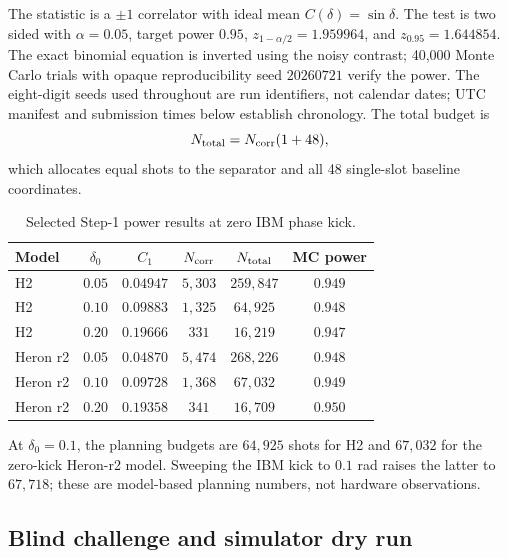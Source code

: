 \documentclass[aps,prl,onecolumn,superscriptaddress,nofootinbib]{revtex4-2}
\begin{document}
The statistic is a $\pm1$ correlator with ideal mean $C(\delta)=\sin\delta$.  The test is two sided with $\alpha=0.05$, target power $0.95$, $z_{1-\alpha/2}=1.959964$, and $z_{0.95}=1.644854$.  The exact binomial equation is inverted using the noisy contrast; 40,000 Monte Carlo trials with opaque reproducibility seed $20260721$ verify the power.  The eight-digit seeds used throughout are run identifiers, not calendar dates; UTC manifest and submission times below establish chronology.  The total budget is
\begin{equation}
 N_{\rm total}=N_{\rm corr}(1+48),
 \label{eq:power-total}
\end{equation}
which allocates equal shots to the separator and all 48 single-slot baseline coordinates.

\begin{table}[t]
\caption{Selected Step-1 power results at zero IBM phase kick.}
\label{tab:step1-power}
\begin{ruledtabular}
\begin{tabular}{lccccc}
Model & $\delta_0$ & $C_1$ & $N_{\rm corr}$ & $N_{\rm total}$ & MC power\\
\hline
H2 & $0.05$ & $0.04947$ & $5{,}303$ & $259{,}847$ & $0.949$\\
H2 & $0.10$ & $0.09883$ & $1{,}325$ & $64{,}925$ & $0.948$\\
H2 & $0.20$ & $0.19666$ & $331$ & $16{,}219$ & $0.947$\\
Heron r2 & $0.05$ & $0.04870$ & $5{,}474$ & $268{,}226$ & $0.948$\\
Heron r2 & $0.10$ & $0.09728$ & $1{,}368$ & $67{,}032$ & $0.949$\\
Heron r2 & $0.20$ & $0.19358$ & $341$ & $16{,}709$ & $0.950$\\
\end{tabular}
\end{ruledtabular}
\end{table}

At $\delta_0=0.1$, the planning budgets are $64{,}925$ shots for H2 and $67{,}032$ for the zero-kick Heron-r2 model.  Sweeping the IBM kick to $0.1$ rad raises the latter to $67{,}718$; these are model-based planning numbers, not hardware observations.

\subsection{Blind challenge and simulator dry run}
\end{document}
